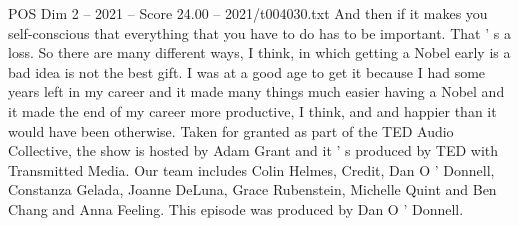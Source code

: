 \begin{textsample}{POS Dim 2 – 2021 – Score 24.00 – 2021/t004030.txt}
And then if it makes you self-conscious that everything that you have to do has to be important.
That ' s a loss.
So there are many different ways, I think, in which getting a Nobel early is a bad idea is not the best gift.
I was at a good age to get it because I had some years left in my career and it made many things much easier having a Nobel and it made the end of my career more productive, I think, and and happier than it would have been otherwise.
Taken for granted as part of the TED Audio Collective, the show is hosted by Adam Grant and it ' s produced by TED with Transmitted Media.
Our team includes Colin Helmes, Credit, Dan O ' Donnell, Constanza Gelada, Joanne DeLuna, Grace Rubenstein, Michelle Quint and Ben Chang and Anna Feeling.
This episode was produced by Dan O ' Donnell.

\end{textsample}
